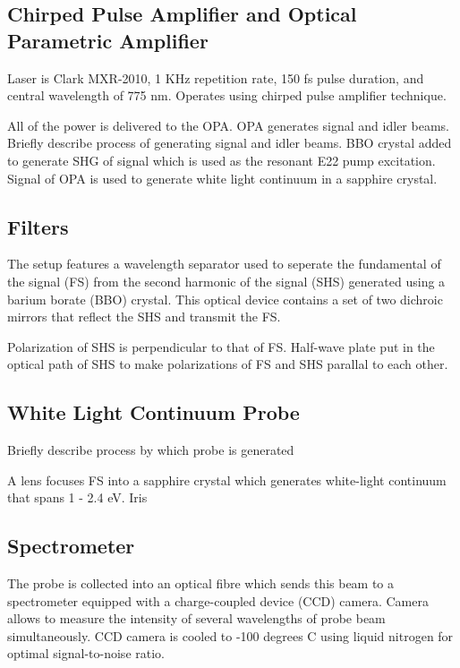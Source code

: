 \subsection{Chirped Pulse Amplifier and Optical Parametric Amplifier}
Laser is Clark MXR-2010, 1 KHz repetition rate, 150 fs pulse duration, and central wavelength of 775 nm. Operates using chirped pulse amplifier technique. 

All of the power is delivered to the OPA. OPA generates signal and idler beams. {\color{red} Briefly describe process of generating signal and idler beams}. BBO crystal added to generate SHG of signal which is used as the resonant E22 pump excitation. Signal of OPA is used to generate white light continuum in a sapphire crystal. 

\subsection{Filters}

The setup features a wavelength separator used to seperate the fundamental of the signal (FS) from the second harmonic of the signal (SHS) generated using a barium borate (BBO) crystal. This optical device contains a set of two dichroic mirrors that reflect the SHS and transmit the FS.  

Polarization of SHS is perpendicular to that of FS. Half-wave plate put in the optical path of SHS to make polarizations of FS and SHS parallal to each other. 
 
\subsection{White Light Continuum Probe}
\label{section:white_light_probe}
{\color{red} Briefly describe process by which probe is generated}

A lens focuses FS into a sapphire crystal which generates white-light continuum that spans 1 - 2.4 eV. Iris 

\subsection{Spectrometer}
The probe is collected into an optical fibre which sends this beam to a spectrometer equipped with a charge-coupled device (CCD) camera. Camera allows to measure the intensity of several wavelengths of probe beam simultaneously. CCD camera is cooled to -100 degrees C using liquid nitrogen for optimal signal-to-noise ratio. 

